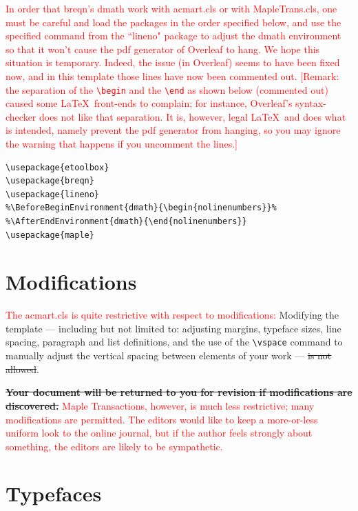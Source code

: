 \documentclass[anonymous,review,acmsmall,screen]{MapleTrans}
\newcommand{\strikethrough}[1]{\sout{#1}}
\begin{document}
\textcolor{red}{In order that breqn's dmath work with acmart.cls or with MapleTrans.cls, one must be careful and load the packages in the order specified below, and use the specified command from the ``lineno" package to adjust the dmath environment so that it won't cause the pdf generator of Overleaf to hang.  We hope this situation is temporary. Indeed, the issue (in Overleaf) seems to have been fixed now, and in this template those lines have now been commented out.
[Remark: the separation of the \texttt{\textbackslash begin}
and the
\texttt{\textbackslash end} as shown below (commented out) caused some \LaTeX\ front-ends to complain; for instance, Overleaf's syntax-checker does not like that separation.  It is, however, legal \LaTeX\ and does what is intended, namely prevent the pdf generator from hanging, so you may ignore the warning that happens if you uncomment the lines.]
}
\begin{verbatim}
\usepackage{etoolbox}
\usepackage{breqn}
\usepackage{lineno}
%\BeforeBeginEnvironment{dmath}{\begin{nolinenumbers}}%
%\AfterEndEnvironment{dmath}{\end{nolinenumbers}}
\usepackage{maple}
\end{verbatim}



\section{Modifications}

\textcolor{red}{The acmart.cls is quite restrictive with respect to modifications: }
Modifying the template --- including but not limited to: adjusting
margins, typeface sizes, line spacing, paragraph and list definitions,
and the use of the \verb|\vspace| command to manually adjust the
vertical spacing between elements of your work --- \strikethrough{is not allowed}.

\strikethrough{\bfseries Your document will be returned to you for revision if
  modifications are discovered.}
\textcolor{red}{Maple Transactions, however, is much less restrictive; many modifications are permitted.  The editors would like to keep a more-or-less uniform look to the online journal, but if the author feels strongly about something, the editors are likely to be sympathetic.}


\section{Typefaces}
\end{document}
